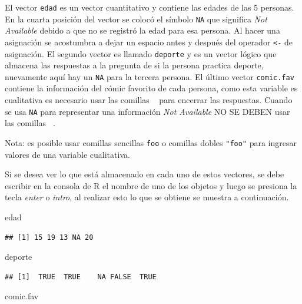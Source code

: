 \documentclass[10pt,]{krantz}
\makeatletter
\newenvironment{Shaded}{\begin{snugshade}}{\end{snugshade}}
\newcommand{\NormalTok}[1]{{#1}}
\let\proglang=\textsf
\newenvironment{kframe}{%
\medskip{}
\setlength{\fboxsep}{.8em}
 \def\at@end@of@kframe{}%
 \ifinner\ifhmode%
  \def\at@end@of@kframe{\end{minipage}}%
  \begin{minipage}{\columnwidth}%
 \fi\fi%
 \def\FrameCommand##1{\hskip\@totalleftmargin \hskip-\fboxsep
 \colorbox{shadecolor}{##1}\hskip-\fboxsep
     \hskip-\linewidth \hskip-\@totalleftmargin \hskip\columnwidth}%
 \MakeFramed {\advance\hsize-\width
   \@totalleftmargin\z@ \linewidth\hsize
   \@setminipage}}%
 {\par\unskip\endMakeFramed%
 \at@end@of@kframe}
\renewenvironment{Shaded}{\begin{kframe}}{\end{kframe}}
\makeatother
\begin{document}
El vector \texttt{edad} es un vector cuantitativo y contiene las edades
de las 5 personas. En la cuarta posición del vector se colocó el símbolo
\texttt{NA} que significa \textit{Not Available} debido a que no se
registró la edad para esa persona. Al hacer una asignación se acostumbra
a dejar un espacio antes y después del operador \texttt{\textless{}-} de
asignación. El segundo vector es llamado \texttt{deporte} y es un vector
lógico que almacena las respuestas a la pregunta de si la persona
practica deporte, nuevamente aquí hay un \texttt{NA} para la tercera
persona. El último vector \texttt{comic.fav} contiene la información del
cómic favorito de cada persona, como esta variable es cualitativa es
necesario usar las comillas
\texttt{\textquotesingle{}\ \textquotesingle{}} para encerrar las
respuestas. Cuando se usa \texttt{NA} para representar una información
\textit{Not Available} NO SE DEBEN usar las comillas
\texttt{\textquotesingle{}\ \textquotesingle{}}.

Nota: es posible usar comillas sencillas
\texttt{\textquotesingle{}foo\textquotesingle{}} o comillas dobles
\texttt{"foo"} para ingresar valores de una variable cualitativa.

Si se desea ver lo que está almacenado en cada uno de estos vectores, se
debe escribir en la consola de \proglang{R} el nombre de uno de los
objetos y luego se presiona la tecla \textit{enter} o \textit{intro}, al
realizar esto lo que se obtiene se muestra a continuación.

\begin{Shaded}
\begin{Highlighting}[]
\NormalTok{edad}
\end{Highlighting}
\end{Shaded}

\begin{verbatim}
## [1] 15 19 13 NA 20
\end{verbatim}

\begin{Shaded}
\begin{Highlighting}[]
\NormalTok{deporte}
\end{Highlighting}
\end{Shaded}

\begin{verbatim}
## [1]  TRUE  TRUE    NA FALSE  TRUE
\end{verbatim}

\begin{Shaded}
\begin{Highlighting}[]
\NormalTok{comic.fav}
\end{Highlighting}
\end{Shaded}
\end{document}
